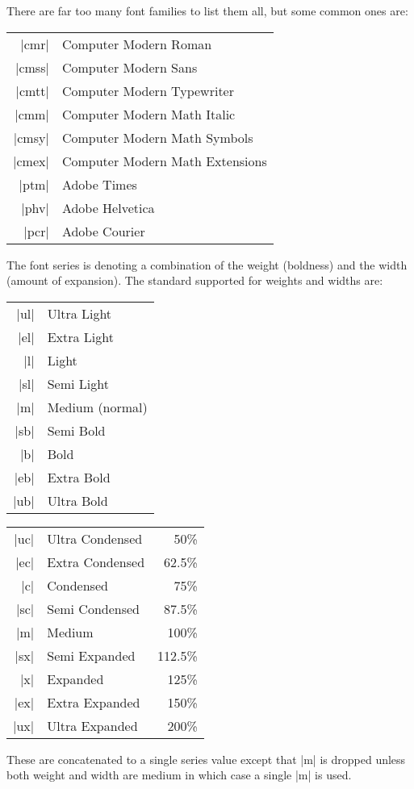 \documentclass{ltxguide}[1995/11/28]
\begin{document}
There are far too many font families to list them all, but some common
ones are:
\begin{center}
  \begin{minipage}{.7\linewidth}
    \begin{tabular}{rl}
      |cmr|  & Computer Modern Roman \\
      |cmss| & Computer Modern Sans \\
      |cmtt| & Computer Modern Typewriter \\
      |cmm|  & Computer Modern Math Italic \\
      |cmsy| & Computer Modern Math Symbols \\
      |cmex| & Computer Modern Math Extensions \\
      |ptm|  & Adobe Times \\
      |phv|  & Adobe Helvetica \\
      |pcr|  & Adobe Courier
    \end{tabular}
  \end{minipage}
\end{center}
\label{page:seriesvalues}
The font series is denoting a combination of the weight (boldness) and
the width (amount of expansion).  The standard supported for weights and
widths are:
\begin{center}
  \begin{tabular}{rl}
    |ul| & Ultra Light     \\
    |el| & Extra Light     \\
    |l|  & Light          \\
    |sl| & Semi Light      \\
    |m|  & Medium (normal)\\
    |sb| & Semi Bold       \\
    |b|  & Bold           \\
    |eb| & Extra Bold      \\
    |ub| & Ultra Bold      \\
  \end{tabular}
  \qquad
  \begin{tabular}{rlr}
    |uc| & Ultra Condensed &  50\%    \\
    |ec| & Extra Condensed &  62.5\%  \\
    |c|  & Condensed       &  75\%    \\
    |sc| & Semi Condensed  &  87.5\%  \\
    |m|  & Medium          &  100\%   \\
    |sx| & Semi Expanded   &  112.5\% \\
    |x|  & Expanded        &  125\%   \\
    |ex| & Extra Expanded  &  150\%   \\
    |ux| & Ultra Expanded  &  200\%   \\
  \end{tabular}
\end{center}
These are concatenated to a single series value except that |m| is
dropped unless both weight and width are medium in which case a single
|m| is used.
\end{document}
